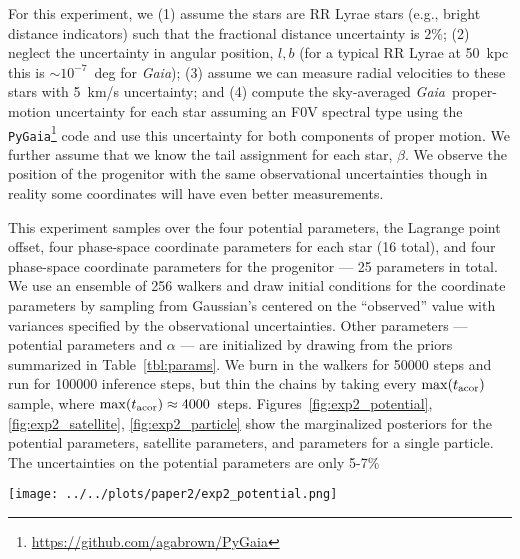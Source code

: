 \documentclass{emulateapj}
\newcommand{\project}[1]{\textsl{#1}}
\newcommand{\gaia}{\project{Gaia}}
\newcommand{\Loffset}{\alpha}
\begin{document}
For this experiment, we (1) assume the stars are RR Lyrae stars (e.g., bright distance indicators) such that the fractional distance uncertainty is $2\%$; (2) neglect the uncertainty in angular position, $l,b$ (for a typical RR Lyrae at 50~kpc this is $\sim$$10^{-7}$~deg for \gaia); (3) assume we can measure radial velocities to these stars with 5~km/s uncertainty; and (4) compute the sky-averaged \gaia\, proper-motion uncertainty for each star assuming an F0V spectral type using the \texttt{PyGaia}\footnote{\url{https://github.com/agabrown/PyGaia}} code and use this uncertainty for both components of proper motion. We further assume that we know the tail assignment for each star, $\beta$. We observe the position of the progenitor with the same observational uncertainties though in reality some coordinates will have even better measurements.

This experiment samples over the four potential parameters, the Lagrange point offset, four phase-space coordinate parameters for each star (16 total), and four phase-space coordinate parameters for the progenitor --- 25 parameters in total. We use an ensemble of 256 walkers and draw initial conditions for the coordinate parameters by sampling from Gaussian's centered on the ``observed'' value with variances specified by the observational uncertainties. Other parameters --- potential parameters and $\Loffset$ --- are initialized by drawing from the priors summarized in Table~\ref{tbl:params}. We burn in the walkers for 50000 steps and run for 100000 inference steps, but thin the chains by taking every $\max(t_{\rm acor})$ sample, where $\max(t_{\rm acor}) \approx 4000$~steps. Figures~\ref{fig:exp2_potential}, \ref{fig:exp2_satellite}, \ref{fig:exp2_particle} show the marginalized posteriors for the potential parameters, satellite parameters, and parameters for a single particle. The uncertainties on the potential parameters are only 5-7\%

\begin{figure*}[!h]
\begin{center}
\texttt{[image: ../../plots/paper2/exp2\_potential.png]}
\caption{ Projections of the marginal posterior over the triaxial potential parameters for observed stars and progenitor with near-future uncertainties (Section~\ref{sec:exp2}). Axis ranges show the lower and upper bounds on the uniform priors over these parameters. }\label{fig:exp2_potential}
\end{center}
\end{figure*}
\end{document}
